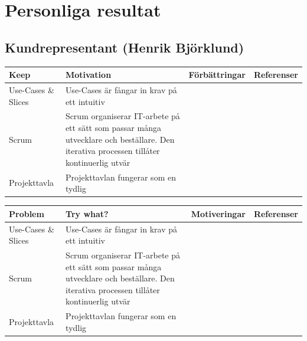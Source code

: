 \documentclass[conference,a4paper]{IEEEtran}
\newcommand\Tstrut{\rule{0pt}{2.6ex}}       %
\newcommand\Bstrut{\rule[-0.9ex]{0pt}{0pt}} %
\newcommand{\TBstrut}{\Tstrut\Bstrut} %
\begin{document}





\appendices
\section{Personliga resultat}

\subsection{Kundrepresentant (Henrik Björklund)}
\begin{table}[H]
	\small
  \centering
	\begin{tabular}{|p{1.5cm}|p{2cm}|p{1.8cm}|p{1.5cm}|} %
    \hline
    Keep & Motivation & Förbättringar & Referenser \TBstrut \\
    \hline
    Use-Cases \& Slices & Use-Cases är fångar in krav på ett intuitiv & & \TBstrut \\
    \hline
    Scrum & Scrum organiserar IT-arbete på ett sätt som passar många utvecklare och beställare. Den iterativa processen tillåter kontinuerlig utvär & & \TBstrut \\
    \hline
    Projekttavla & Projekttavlan fungerar som en tydlig & & \TBstrut \\
    \hline
  \end{tabular}
\end{table}

\begin{table}[H]
	\small
  \centering
	\begin{tabular}{|p{1.5cm}|p{2cm}|p{1.8cm}|p{1.5cm}|} %
    \hline
    Problem & Try what? & Motiveringar & Referenser \TBstrut \\
    \hline
    Use-Cases \& Slices & Use-Cases är fångar in krav på ett intuitiv & & \TBstrut \\
    \hline
    Scrum & Scrum organiserar IT-arbete på ett sätt som passar många utvecklare och beställare. Den iterativa processen tillåter kontinuerlig utvär & & \TBstrut \\
    \hline
    Projekttavla & Projekttavlan fungerar som en tydlig & & \TBstrut \\
    \hline
  \end{tabular}
\end{table}
\end{document}

